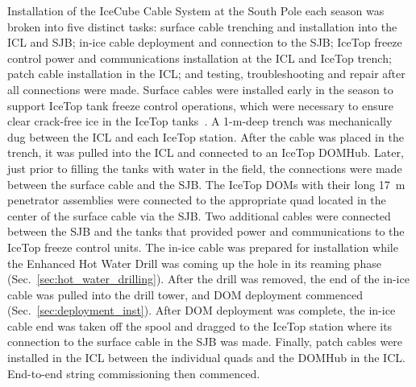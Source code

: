 Installation of the IceCube Cable System at the South Pole each season was
broken into five distinct tasks: surface cable trenching and
installation into the ICL and SJB; in-ice cable deployment and
connection to the SJB; IceTop freeze control power and communications installation at the ICL and
IceTop trench; patch cable installation in the ICL; and testing,
troubleshooting and repair after all connections were made. Surface cables
were installed early in the season to support IceTop tank freeze control
operations, which were necessary to ensure clear crack-free ice in the
IceTop tanks~\cite{ICECUBE:IceTop}. A 1-m-deep trench was mechanically
dug between the ICL and each IceTop station. After the cable was placed in
the trench, it was pulled into the ICL and connected to an IceTop
DOMHub. Later, just prior to filling the tanks with water in the field, the
connections were made between the surface cable and the SJB. The IceTop
DOMs with their long 17~m penetrator assemblies were connected to the
appropriate quad located in the center of the surface cable via the SJB. Two additional
cables were connected between the SJB and the tanks that provided power and
communications to the IceTop freeze control units. The in-ice cable
was prepared for installation while the Enhanced Hot Water Drill was coming
up the hole in its reaming phase (Sec.~\ref{sec:hot_water_drilling}).  After the drill was removed,
the end of the in-ice cable was pulled into the drill tower, and DOM deployment
commenced (Sec.~\ref{sec:deployment_inst}). After DOM
deployment was complete, the in-ice cable end was taken off the spool and
dragged to the IceTop station where its connection to the surface cable in the SJB was
made. Finally, patch cables were installed in the ICL between the
individual quads and the DOMHub in the ICL. End-to-end string commissioning
then commenced.
